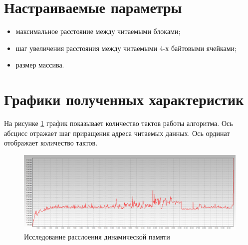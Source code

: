 \section{Настраиваемые параметры}

\begin{itemize}
	\item максимальное расстояние между читаемыми блоками;
	\item шаг увеличения расстояния между читаемыми 4-х байтовыми ячейками;
	\item размер массива.
\end{itemize}

\section{Графики полученных характеристик}

На рисунке \ref{img:delimitation} график показывает количество тактов работы алгоритма. Ось абсцисс отражает шаг приращения адреса читаемых данных. Ось ординат отображает количество тактов.

\begin{figure}[H]
	\begin{center}
		\includegraphics[scale=0.25]{img/lab_03_01.jpg}
	\end{center}
	\captionsetup{justification=centering}
	\caption{Исследование расслоения динамической памяти}
	\label{img:delimitation}
\end{figure}

%
%

